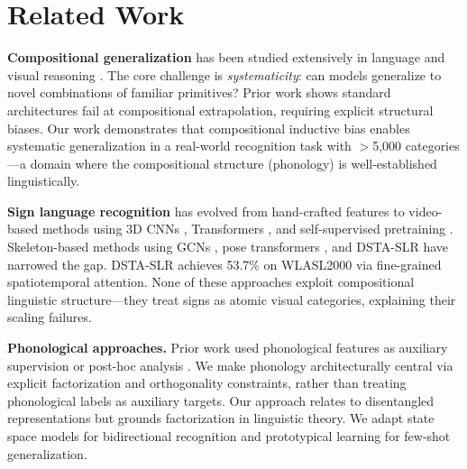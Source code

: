 \documentclass[runningheads]{llncs}
\begin{document}
\section{Related Work}

\textbf{Compositional generalization} has been studied extensively in language \cite{lake2018generalization,keysers2020measuring} and visual reasoning \cite{bahdanau2019systematic}. The core challenge is \textit{systematicity}: can models generalize to novel combinations of familiar primitives? Prior work shows standard architectures fail at compositional extrapolation, requiring explicit structural biases. Our work demonstrates that compositional inductive bias enables systematic generalization in a real-world recognition task with $>$5,000 categories---a domain where the compositional structure (phonology) is well-established linguistically.

\textbf{Sign language recognition} has evolved from hand-crafted features \cite{cooper2011sign} to video-based methods using 3D CNNs \cite{carreira2017quo,feichtenhofer2019slowfast,lin2019tsm}, Transformers \cite{camgoz2020sign}, and self-supervised pretraining \cite{hu2021signbert}. Skeleton-based methods using GCNs \cite{yan2018spatial,li2020word,shi2019two,duan2022pyskl}, pose transformers \cite{bohacek2022spoter}, and DSTA-SLR \cite{hu2024dsta} have narrowed the gap. DSTA-SLR achieves 53.7\% on WLASL2000 via fine-grained spatiotemporal attention. None of these approaches exploit compositional linguistic structure---they treat signs as atomic visual categories, explaining their scaling failures.

\textbf{Phonological approaches.} Prior work used phonological features as auxiliary supervision \cite{koller2015continuous} or post-hoc analysis \cite{bragg2019sign}. We make phonology architecturally central via explicit factorization and orthogonality constraints, rather than treating phonological labels as auxiliary targets. Our approach relates to disentangled representations \cite{higgins2017beta} but grounds factorization in linguistic theory. We adapt state space models \cite{gu2022efficiently,gu2023mamba} for bidirectional recognition and prototypical learning \cite{snell2017prototypical} for few-shot generalization.

\end{document}

